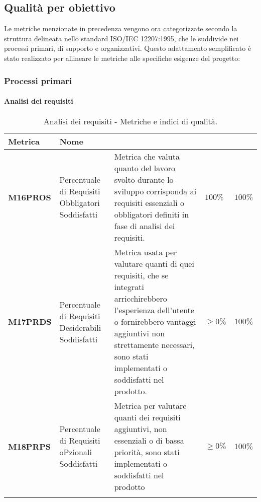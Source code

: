\subsection{Qualità per obiettivo}
Le metriche menzionate in precedenza vengono ora categorizzate secondo la struttura delineata nello standard ISO/IEC 12207:1995, che le suddivide nei processi primari, di supporto e organizzativi. Questo adattamento semplificato è stato realizzato per allineare le metriche alle specifiche esigenze del progetto:

\subsubsection{Processi primari}
\paragraph{Analisi dei requisiti}
\hspace{1pt}
    \begin{longtable}{|C{1.5cm}|L{3cm}|L{4cm}|L{2.5cm}|L{2.5cm}|}
        \hline
        \textbf{Metrica} & \textbf{Nome} & \textbf{} & \textbf{} & \textbf{} \\
        \hline\textbf{M16PROS} & Percentuale di Requisiti Obbligatori Soddisfatti &  Metrica che valuta quanto del lavoro svolto durante lo sviluppo corrisponda ai requisiti essenziali o obbligatori definiti in fase di analisi dei requisiti.  & $ 100\%$  & $ 100\%$ \\
        \hline
        \textbf{M17PRDS} & Percentuale di Requisiti Desiderabili Soddisfatti & Metrica usata per valutare quanti di quei requisiti, che se integrati arricchirebbero l'esperienza dell'utente o fornirebbero vantaggi aggiuntivi non strettamente necessari, sono stati implementati o soddisfatti nel prodotto. & $\geq 0\%$ & $100\%$ \\
        \hline
        \textbf{M18PRPS} & Percentuale di Requisiti oPzionali Soddisfatti & Metrica per valutare quanti dei requisiti aggiuntivi, non essenziali o di bassa priorità, sono stati implementati o soddisfatti nel prodotto & $\geq 0\%$ & $100\%$ \\
        \hline
    \caption{Analisi dei requisiti - Metriche e indici di qualità.}
    \label{tab:analisi_requisiti_progetto}
\end{longtable}

